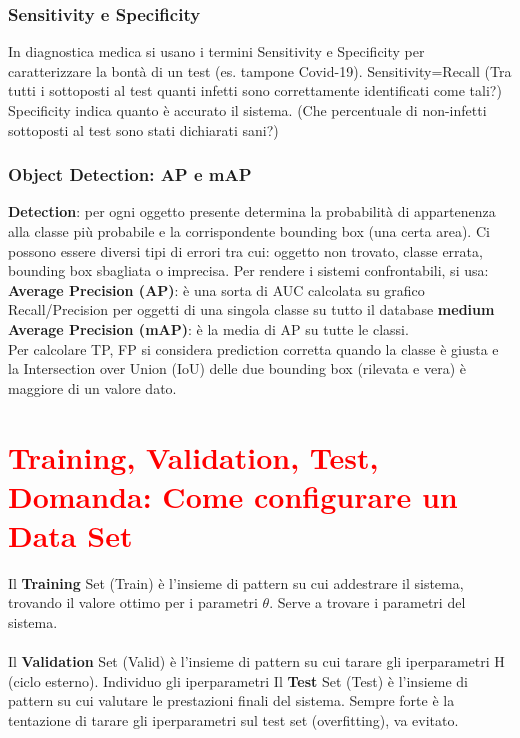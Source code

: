 \documentclass{article}
\begin{document}
\subsubsection{Sensitivity e Specificity}
In diagnostica medica si usano i termini Sensitivity e Specificity per caratterizzare la bontà di un test (es. tampone Covid-19). Sensitivity=Recall (Tra tutti i sottoposti al test quanti infetti sono correttamente identificati come tali?)\\ 
Specificity indica quanto è accurato il sistema. (Che percentuale di non-infetti sottoposti al test sono stati dichiarati sani?)
\subsubsection{Object Detection: AP e mAP}
\textbf{Detection}: per ogni oggetto presente determina la probabilità di appartenenza alla classe più probabile e la corrispondente bounding box (una certa area). Ci possono essere diversi tipi di errori tra cui: oggetto non trovato, classe errata, bounding box sbagliata o imprecisa. Per rendere i sistemi confrontabili, si usa:\\
\textbf{Average Precision (AP)}: è una sorta di AUC calcolata su grafico Recall/Precision per oggetti di una singola classe su tutto il database
\textbf{medium Average Precision (mAP)}: è la media di AP su tutte le classi.\\
Per calcolare TP, FP si considera prediction corretta quando la classe è giusta e la Intersection over Union (IoU) delle due bounding box (rilevata e vera) è maggiore di un valore dato.
\section{\textcolor{red}{Training, Validation, Test, Domanda: Come configurare un Data Set}}
Il \textbf{Training} Set (Train) è l'insieme di pattern su cui addestrare il sistema, trovando il valore ottimo per i parametri $\theta$. Serve a trovare i parametri del sistema.\\\\
Il \textbf{Validation} Set (Valid) è l'insieme di pattern su cui tarare gli iperparametri H (ciclo esterno). Individuo gli iperparametri
Il \textbf{Test} Set (Test) è l'insieme di pattern su cui valutare le prestazioni finali del sistema. Sempre forte è la tentazione di tarare gli iperparametri sul test set (overfitting), va evitato.
\end{document}
